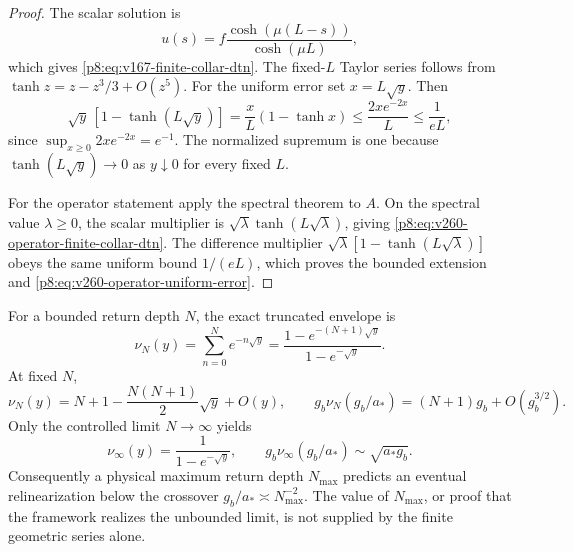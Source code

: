\documentclass[12pt,a4paper]{article}
\begin{document}
\begin{proof}
The scalar solution is
\[
 u(s)=f\frac{\cosh(\mu(L-s))}{\cosh(\mu L)},
\]
which gives \eqref{p8:eq:v167-finite-collar-dtn}.  The fixed-\(L\) Taylor
series follows from \(\tanh z=z-z^3/3+O(z^5)\).  For the uniform error set
\(x=L\sqrt y\).  Then
\[
 \sqrt y\,[1-\tanh(L\sqrt y)]
 =\frac{x}{L}(1-\tanh x)
 \le\frac{2xe^{-2x}}{L}
 \le\frac1{eL},
\]
since \(\sup_{x\ge0}2xe^{-2x}=e^{-1}\).  The normalized supremum is one
because \(\tanh(L\sqrt y)\to0\) as \(y\downarrow0\) for every fixed \(L\).

For the operator statement apply the spectral theorem to \(A\).  On the
spectral value \(\lambda\ge0\), the scalar multiplier is
\(\sqrt\lambda\tanh(L\sqrt\lambda)\), giving
\eqref{p8:eq:v260-operator-finite-collar-dtn}.  The difference multiplier
\(\sqrt\lambda[1-\tanh(L\sqrt\lambda)]\) obeys the same uniform bound
\(1/(eL)\), which proves the bounded extension and
\eqref{p8:eq:v260-operator-uniform-error}.
\end{proof}

\begin{corollary}
\label{p8:cor:v167-finite-return-relinearization}
For a bounded return depth \(N\), the exact truncated envelope is
\[
 \nu_N(y)=\sum_{n=0}^{N}e^{-n\sqrt y}
 =\frac{1-e^{-(N+1)\sqrt y}}{1-e^{-\sqrt y}}.
\]
At fixed \(N\),
\[
 \nu_N(y)=N+1-\frac{N(N+1)}2\sqrt y+O(y),
 \qquad
 g_b\nu_N(g_b/a_*)=(N+1)g_b+O(g_b^{3/2}).
\]
Only the controlled limit \(N\to\infty\) yields
\[
 \nu_\infty(y)=\frac1{1-e^{-\sqrt y}},
 \qquad
 g_b\nu_\infty(g_b/a_*)\sim\sqrt{a_*g_b}.
\]
Consequently a physical maximum return depth \(N_{\max}\) predicts an
eventual relinearization below the crossover
\(g_b/a_*\asymp N_{\max}^{-2}\).  The value of \(N_{\max}\), or proof that
the framework realizes the unbounded limit, is not supplied by the finite
geometric series alone.
\end{corollary}
\end{document}
